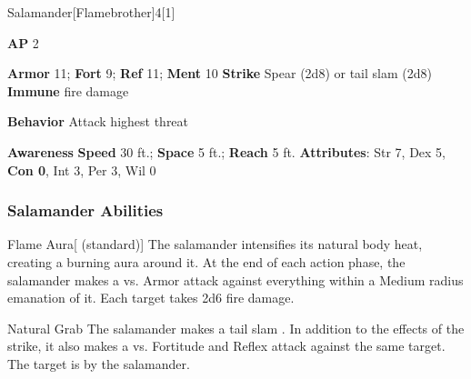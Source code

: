 \begin{monsection}{Salamander}[Flamebrother]{4}[1]
\vspace{-1em}\vspace{-1em}
\begin{spellcontent}
\begin{spelltargetinginfo}
{\textbf{AP} 2}

\pari \textbf{Armor} 11;
\textbf{Fort} 9;
\textbf{Ref} 11;
\textbf{Ment} 10
\pari \textbf{Strike} Spear  (2d8) or tail slam  (2d8)
\pari \textbf{Immune} fire damage


\pari \textbf{Behavior} Attack highest threat
\end{spelltargetinginfo}
\end{spellcontent}

\begin{monsterfooter}
\pari \textbf{Awareness} 
\pari \textbf{Speed} 30 ft.;
\textbf{Space} 5 ft.;
\textbf{Reach} 5 ft.
\pari \textbf{Attributes}:
Str 7,
Dex 5,
\textbf{Con 0},
Int 3,
Per 3,
Wil 0
\end{monsterfooter}
\end{monsection}


\subsubsection{Salamander Abilities}

\begin{apability}{Flame Aura}[ (standard)]
The salamander intensifies its natural body heat, creating a burning aura around it.
At the end of each action phase, the salamander makes a  vs. Armor
attack against everything within a Medium radius emanation of it.
\hit Each target takes 2d6 fire damage.
\end{apability}

\vspace{0.5em}
\begin{freeability}{Natural Grab}
The salamander makes a tail slam .
In addition to the effects of the strike, it also makes a  vs. Fortitude and Reflex attack against the same target.
\hit The target is  by the salamander.
\end{freeability}

